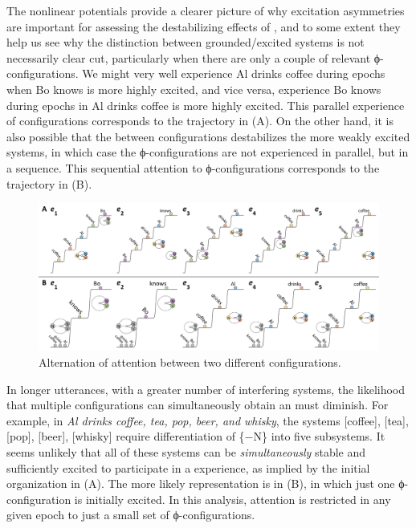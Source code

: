   The nonlinear potentials provide a clearer picture of why excitation asymmetries are important for assessing the destabilizing effects of , and to some extent they help us see why the distinction between grounded/excited systems is not necessarily clear cut, particularly when there are only a couple of relevant ϕ-con\-fig\-u\-ra\-tions. We might very well experience {\textbar}Al drinks coffee{\textbar} during epochs when {\textbar}Bo knows{\textbar} is more highly excited, and vice versa, experience {\textbar}Bo knows{\textbar} during epochs in {\textbar}Al drinks coffee{\textbar} is more highly excited. This parallel experience of configurations corresponds to the trajectory in {}(A). On the other hand, it is also possible that the  between configurations destabilizes the more weakly excited systems, in which case the ϕ-con\-fig\-u\-ra\-tions are not experienced in parallel, but in a sequence. This sequential attention to ϕ-con\-fig\-u\-ra\-tions corresponds to the trajectory in {}(B).

  
\begin{figure}
\includegraphics[width=\textwidth]{figures/Tilsen-img97.png}
\caption{Alternation of attention between two different configurations.}
\label{fig:4:47}
\end{figure}
 

  In longer utterances, with a greater number of interfering systems, the likelihood that multiple configurations can simultaneously obtain an  must diminish. For example, in \textit{Al drinks coffee, tea, pop, beer, and whisky}, the systems [coffee], [tea], [pop], [beer], [whisky] require differentiation of \{−N\} into five subsystems. It seems unlikely that all of these systems can be \textit{simultaneously} stable and sufficiently excited to participate in a  experience, as implied by the initial organization in {}(A). The more likely representation is in (B), in which just one ϕ-con\-fig\-u\-ra\-tion is initially excited. In this analysis, attention is restricted in any given epoch to just a small set of ϕ-con\-fig\-u\-ra\-tions.

